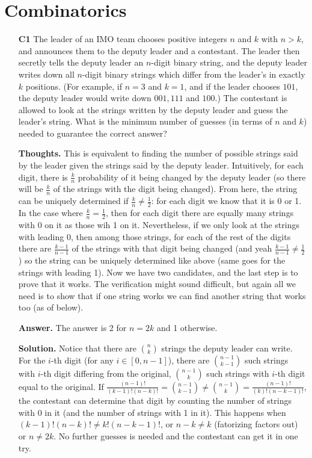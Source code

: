 \documentclass[11pt,a4paper]{article}
\begin{document}
\section{Combinatorics}
\begin{itemize}
\item[\textbf{C1}]
 The leader of an IMO team chooses positive integers $n$ and $k$ with $n > k$, and announces them to the deputy leader and a contestant. The leader then secretly tells the deputy leader an $n$-digit binary string, and the deputy leader writes down all $n$-digit binary strings which differ from the leader’s in exactly $k$ positions. (For example, if $n = 3$ and $k = 1$, and if the leader chooses $101$, the deputy leader would write down $001, 111$ and $100$.) The contestant is allowed to look at the strings written by the deputy leader and guess the leader’s string. What is the minimum number of guesses (in terms of $n$ and $k$) needed to guarantee the correct answer?

\textbf{Thoughts.} 
This is equivalent to finding the number of possible strings said by the leader given the strings said by the deputy leader. 
Intuitively, for each digit, there is $\frac kn$ probability of it being changed by the deputy leader (so there will be $\frac kn$ of the strings with the digit being changed). 
From here, the string can be uniquely determined if $\frac kn\neq \frac 12$: 
for each digit we know that it is 0 or 1.  
In the case where $\frac kn=\frac 12$, 
then for each digit there are equally many strings with 0 on it as those wih 1 on it. 
Nevertheless, if we only look at the strings with leading 0, 
then among those strings, for each of the rest of the digits there are $\frac{k-1}{n-1}$ of the strings with that digit being changed 
(and yeah $\frac{k-1}{n-1}\neq \frac 12$) 
so the string can be uniquely determined like above (same goes for the strings with leading 1). 
Now we have two candidates, and the last step is to prove that it works. 
The verification might sound difficult, but again all we need is to show that if one string works we can find another string that works too (as of below). 

\textbf{Answer.} The answer is 2 for $n=2k$ and 1 otherwise. 

\textbf{Solution.}
Notice that there are $\binom nk$ strings the deputy leader can write. 
For the $i$-th digit (for any $i\in [0, n-1]$), there are $\binom {n-1}{k-1}$ such strings with $i$-th digit differing from the original, 
$\binom {n-1}k$ such strings with $i$-th digit equal to the original. 
If $\frac{(n-1)!}{(k-1)!(n-k)!}=\binom {n-1}{k-1}\neq \binom {n-1}k=\frac{(n-1)!}{(k)!(n-k-1)!}$, the contestant can determine that digit by counting the number of strings with 0 in it (and the number of strings with 1 in it). 
This happens when $(k-1)!(n-k)!\neq k!(n-k-1)!$, or $n-k\neq k$ (fatorizing factors out) or $n\neq 2k$. 
No further guesses is needed and the contestant can get it in one try. 


\end{itemize}
\end{document}
